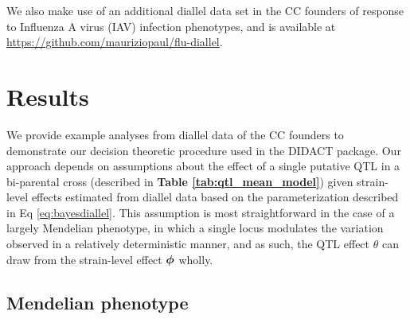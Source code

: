 We also make use of an additional diallel data set in the CC founders of response to Influenza A virus (IAV) infection phenotypes, and is available at \url{https://github.com/mauriziopaul/flu-diallel}.

\section{Results}

We provide example analyses from diallel data of the CC founders to demonstrate our decision theoretic procedure used in the DIDACT package. Our approach depends on assumptions about the effect of a single putative QTL in a bi-parental cross (described in \textbf{Table \ref{tab:qtl_mean_model}}) given strain-level effects estimated from diallel data based on the parameterization described in Eq \ref{eq:bayesdiallel}. This assumption is most straightforward in the case of a largely Mendelian phenotype, in which a single locus modulates the variation observed in a relatively deterministic manner, and as such, the QTL effect $\theta$ can draw from the strain-level effect $\boldsymbol{\phi}$ wholly.

\subsection{Mendelian phenotype}

